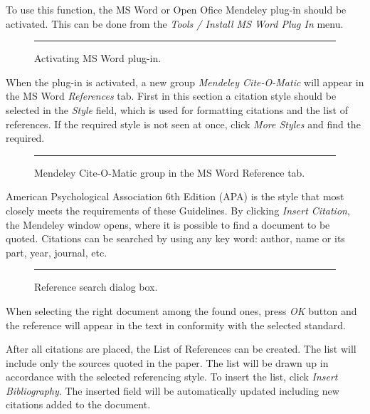 To use this function, the MS Word or Open Ofice Mendeley plug-in should be activated. This can be done from the \emph{Tools / Install MS Word Plug In} menu.

\begin{figure}[ht]
  \centering
  \rule{0.8\linewidth}{0.35\linewidth}
  \caption{Activating MS Word plug-in.}
  \label{fig:mend-word-plugin}
\end{figure}

When the plug-in is activated, a new group \emph{Mendeley Cite-O-Matic} will appear in the MS Word \emph{References} tab. First in this section a citation style should be selected in the \emph{Style} field, which is used for formatting citations and the list of references. If the required style is not seen at once, click \emph{More Styles} and find the required.

\begin{figure}[ht]
  \centering
  \rule{0.8\linewidth}{0.35\linewidth}
  \caption{Mendeley Cite-O-Matic group in the MS Word Reference tab.}
  \label{fig:mend-cite-o-matic}
\end{figure}

American Psychological Association 6th Edition (APA) is the style that most closely meets the requirements of these Guidelines. By clicking \emph{Insert Citation}, the Mendeley window opens, where it is possible to find a document to be quoted. Citations can be searched by using any key word: author, name or its part, year, journal, etc.

\begin{figure}[ht]
  \centering
  \rule{0.8\linewidth}{0.35\linewidth}
  \caption{Reference search dialog box.}
  \label{fig:mend-ref-search}
\end{figure}

When selecting the right document among the found ones, press \emph{OK} button and the reference will appear in the text in conformity with the selected standard.

After all citations are placed, the List of References can be created. The list will include only the sources quoted in the paper. The list will be drawn up in accordance with the selected referencing style. To insert the list, click \emph{Insert Bibliography}. The inserted field will be automatically updated including new citations added to the document.
